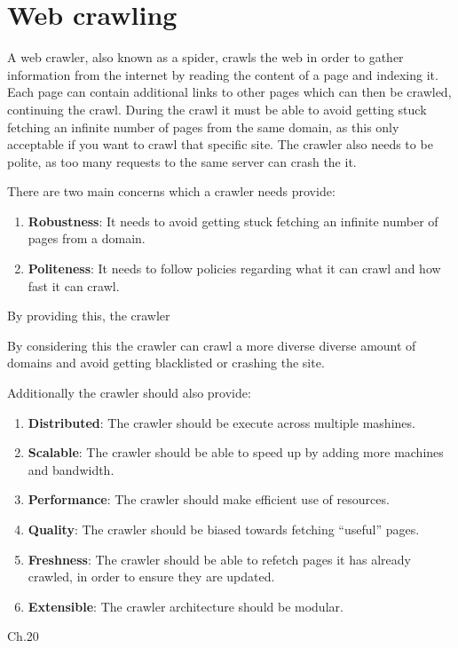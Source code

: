 \section{Web crawling}

A web crawler, also known as a spider, crawls the web in order to gather
information from the internet by reading the content of a page and indexing it.
Each page can contain additional links to other pages which can then be
crawled, continuing the crawl. During the crawl it must be able to avoid
getting stuck fetching an infinite number of pages from the same domain, as
this only acceptable if you want to crawl that specific site. The crawler also
needs to be polite, as too many requests to the same server can crash the it. 

There are two main concerns which a crawler needs provide:
\begin{enumerate}
  \item \textbf{Robustness}: It needs to avoid getting stuck fetching an
  infinite number of pages from a domain.
  \item \textbf{Politeness}: It needs to follow policies regarding what it can
  crawl and how fast it can crawl. 
\end{enumerate}

By providing this, the crawler 
 
By considering this the crawler can crawl a more diverse diverse amount of
domains and avoid getting blacklisted or crashing the site.

Additionally the crawler should also provide:
\begin{enumerate}
  \item \textbf{Distributed}: The crawler should be execute across multiple
  mashines.
  \item \textbf{Scalable}: The crawler should be able to speed up by adding more
  machines and bandwidth.
  \item \textbf{Performance}: The crawler should make efficient use of
  resources.
  \item \textbf{Quality}: The crawler should be biased towards fetching
  ``useful'' pages.
  \item \textbf{Freshness}: The crawler should be able to refetch pages it has
  already crawled, in order to ensure they are updated.
  \item \textbf{Extensible}: The crawler architecture should be modular.
\end{enumerate}
\citep{manning2008introduction}{Ch.20}

